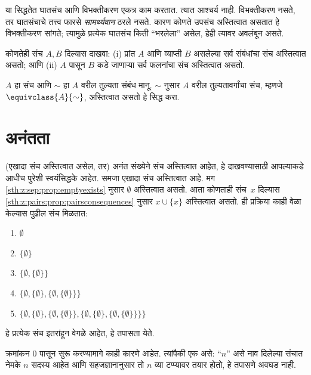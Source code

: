 या सिद्धतेत घातसंच आणि विभक्तीकरण एकत्र काम करतात. त्यात आश्चर्य नाही. विभक्तीकरण नसते, तर घातसंचाचे तत्त्व फारसे \emph{सामर्थ्यवान} ठरले नसते. कारण कोणते उपसंच अस्तित्वात असतात हे विभक्तीकरण सांगते; त्यामुळे प्रत्येक घातसंच किती ``भरलेला'' असेल, हेही त्यावर अवलंबून असते.

\begin{prob}
कोणतेही संच $A, B$ दिल्यास दाखवा: (i) प्रांत $A$ आणि व्याप्ती $B$ असलेल्या सर्व संबंधांचा संच अस्तित्वात असतो; आणि (ii) $A$ पासून $B$ कडे जाणाऱ्या सर्व फलनांचा संच अस्तित्वात असतो.
\end{prob}

\begin{prob}
$A$ हा संच आणि $\sim$ हा $A$ वरील तुल्यता संबंध मानू. $\sim$ नुसार $A$ वरील तुल्यतावर्गांचा संच, म्हणजे $\equivclass{A}{\sim}$, अस्तित्वात असतो हे सिद्ध करा.
\end{prob}








\section{अनंतता}\label{sth:z:infinity-again:sec}

(एखादा संच अस्तित्वात असेल, तर) अनंत संख्येने संच अस्तित्वात आहेत, हे दाखवण्यासाठी आपल्याकडे आधीच पुरेशी स्वयंसिद्धके आहेत. समजा एखादा संच अस्तित्वात आहे. मग \ref{sth:z:sep:prop:emptyexists} नुसार $\emptyset$ अस्तित्वात असतो. आता कोणताही संच~$x$ दिल्यास \ref{sth:z:pairs:prop:pairsconsequences} नुसार $x \cup \{x\}$ अस्तित्वात असतो. ही प्रक्रिया काही वेळा केल्यास पुढील संच मिळतात:
\begin{enumerate}
	\item[0.] $\emptyset$
	\item[1.] $ \{\emptyset\}$
	\item[2.] $\{\emptyset, \{\emptyset\}\}$
	\item[3.] $\{\emptyset, \{\emptyset\}, \{\emptyset, \{\emptyset\}\}\}$
	\item[4.] $\{\emptyset, \{\emptyset\}, \{\emptyset, \{\emptyset\}\}, \{\emptyset, \{\emptyset\}, \{\emptyset, \{\emptyset\}\}\}\}$
\end{enumerate}
हे प्रत्येक संच इतरांहून वेगळे आहेत, हे तपासता येते.

क्रमांकन $0$ पासून सुरू करण्यामागे काही कारणे आहेत. त्यांपैकी एक असे: ``$n$'' असे नाव दिलेल्या संचात नेमके $n$ सदस्य आहेत आणि सहजज्ञानानुसार तो $n$ व्या टप्प्यावर तयार होतो, हे तपासणे अवघड नाही.

